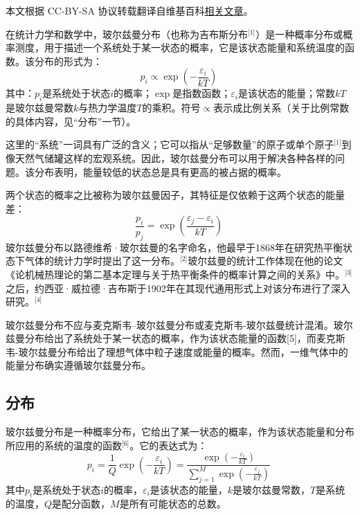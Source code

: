 
本文根据 CC-BY-SA 协议转载翻译自维基百科\href{https://en.wikipedia.org/wiki/Boltzmann_distribution}{相关文章}。

在统计力学和数学中，玻尔兹曼分布（也称为吉布斯分布\(^\text{[1]}\)）是一种概率分布或概率测度，用于描述一个系统处于某一状态的概率，它是该状态能量和系统温度的函数。该分布的形式为：
\[
p_i \propto \exp\left(-\frac{\varepsilon_i}{kT}\right)~
\]
其中：\( p_i \)是系统处于状态\( i \)的概率；\( \exp \)是指数函数；\( \varepsilon_i \)是该状态的能量；常数\( kT \)是玻尔兹曼常数\( k \)与热力学温度\( T \)的乘积。符号\( \propto \)表示成比例关系（关于比例常数的具体内容，见“分布”一节）。

这里的“系统”一词具有广泛的含义；它可以指从“足够数量”的原子或单个原子\(^\text{[1]}\)到像天然气储罐这样的宏观系统。因此，玻尔兹曼分布可以用于解决各种各样的问题。该分布表明，能量较低的状态总是具有更高的被占据的概率。

两个状态的概率之比被称为玻尔兹曼因子，其特征是仅依赖于这两个状态的能量差：
\[
\frac{p_i}{p_j} = \exp\left(\frac{\varepsilon_j - \varepsilon_i}{kT}\right)~
\]
玻尔兹曼分布以路德维希·玻尔兹曼的名字命名，他最早于1868年在研究热平衡状态下气体的统计力学时提出了这一分布。\(^\text{[2]}\)玻尔兹曼的统计工作体现在他的论文《论机械热理论的第二基本定理与关于热平衡条件的概率计算之间的关系》中。\(^\text{[3]}\)之后，约西亚·威拉德·吉布斯于1902年在其现代通用形式上对该分布进行了深入研究。\(^\text{[4]}\)

玻尔兹曼分布不应与麦克斯韦–玻尔兹曼分布或麦克斯韦-玻尔兹曼统计混淆。玻尔兹曼分布给出了系统处于某一状态的概率，作为该状态能量的函数[5]，而麦克斯韦-玻尔兹曼分布给出了理想气体中粒子速度或能量的概率。然而，一维气体中的能量分布确实遵循玻尔兹曼分布。
\subsection{分布}  
玻尔兹曼分布是一种概率分布，它给出了某一状态的概率，作为该状态能量和分布所应用的系统的温度的函数\(^\text{[6]}\)。它的表达式为：
\[
p_i = \frac{1}{Q} \exp\left(-\frac{\varepsilon_i}{kT}\right) = \frac{\exp\left(-\frac{\varepsilon_i}{kT}\right)}{\sum_{j=1}^{M} \exp\left(-\frac{\varepsilon_j}{kT}\right)}~
\]
其中\( p_i \)是系统处于状态\( i \)的概率，\( \varepsilon_i \)是该状态的能量，\( k \)是玻尔兹曼常数，\( T \)是系统的温度，\( Q \)是配分函数，\( M \)是所有可能状态的总数。